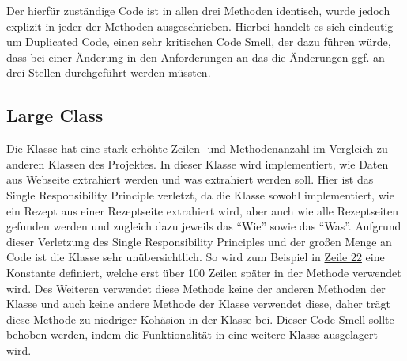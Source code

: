 Der hierfür zuständige Code ist in allen drei Methoden identisch, wurde jedoch explizit in jeder der Methoden ausgeschrieben. Hierbei handelt es sich eindeutig um Duplicated Code, einen sehr kritischen Code Smell, der dazu führen würde, dass bei einer Änderung in den Anforderungen an das  die Änderungen ggf. an drei Stellen durchgeführt werden müssten.

\subsection{Large Class}
Die Klasse \href{https://github.com/anditru/quickie/blob/bb41442c7f1ffbfcd3117cd86a40f7932e543a33/0-quickie-plugin-scraper/src/main/java/org/pinkcrazyunicorn/quickie/plugins/scraper/HensslerScraper.java}{} hat eine stark erhöhte Zeilen- und Methodenanzahl im Vergleich zu anderen Klassen des Projektes. In dieser Klasse wird implementiert, wie Daten aus Webseite extrahiert werden und was extrahiert werden soll. Hier ist das Single Responsibility Principle verletzt, da die Klasse sowohl implementiert, wie ein Rezept aus einer Rezeptseite extrahiert wird, aber auch wie alle Rezeptseiten gefunden werden und zugleich dazu jeweils das \enquote{Wie} sowie das \enquote{Was}. Aufgrund dieser Verletzung des Single Responsibility Principles und der großen Menge an Code ist die Klasse sehr unübersichtlich. So wird zum Beispiel in \href{https://github.com/anditru/quickie/blob/bb41442c7f1ffbfcd3117cd86a40f7932e543a33/0-quickie-plugin-scraper/src/main/java/org/pinkcrazyunicorn/quickie/plugins/scraper/HensslerScraper.java#L22}{Zeile 22} eine Konstante definiert, welche erst über 100 Zeilen später in der Methode \href{https://github.com/anditru/quickie/blob/bb41442c7f1ffbfcd3117cd86a40f7932e543a33/0-quickie-plugin-scraper/src/main/java/org/pinkcrazyunicorn/quickie/plugins/scraper/HensslerScraper.java#L149}{} verwendet wird. Des Weiteren verwendet diese Methode keine der anderen Methoden der Klasse und auch keine andere Methode der Klasse verwendet diese, daher trägt diese Methode zu niedriger Kohäsion in der Klasse bei. Dieser Code Smell sollte behoben werden, indem die Funktionalität in eine weitere Klasse ausgelagert wird.

